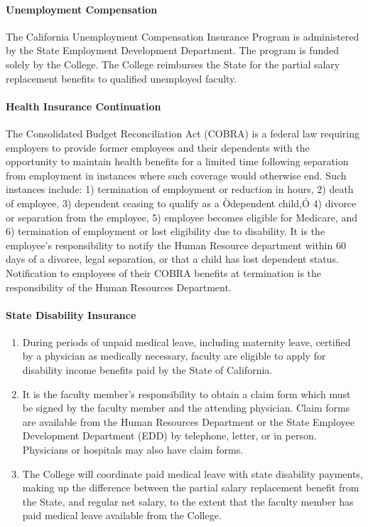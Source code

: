 \documentclass[letterpaper, 11pt]{article}
\begin{document}
			\paragraph{Unemployment Compensation}
				The California Unemployment Compensation Insurance Program is administered by the State Employment Development Department.  The program is funded solely by the College. The College reimburses the State for the partial salary replacement benefits to qualified unemployed faculty.
			\paragraph{Health Insurance Continuation}
				The Consolidated Budget Reconciliation Act (COBRA) is a federal law requiring employers to provide former employees and their dependents with the opportunity to maintain health benefits for a limited time following separation from employment in instances where such coverage would otherwise end.  Such instances include:  1) termination of employment or reduction in hours, 2) death of employee, 3) dependent ceasing to qualify as a Òdependent child,Ó 4) divorce or separation from the employee, 5) employee becomes eligible for Medicare, and 6) termination of employment or lost eligibility due to disability.  It is the employee's responsibility to notify the Human Resource department within 60 days of a divorce, legal separation, or that a child has lost dependent status.  Notification to employees of their COBRA benefits at termination is the responsibility of the Human Resources Department.
			\paragraph{State Disability Insurance}
				\begin{enumerate}[label=\alph*)]
					\item{During periods of unpaid medical leave, including maternity leave, certified by a physician as medically necessary, faculty are eligible to apply for disability income benefits paid by the State of California.}
					\item{It is the faculty member's responsibility to obtain a claim form which must be signed by the faculty member and the attending physician.  Claim forms are available from the Human Resources Department or the State Employee Development Department (EDD) by telephone, letter, or in person.  Physicians or hospitals may also have claim forms.}
					\item{The College will coordinate paid medical leave with state disability payments, making up the difference between the partial salary replacement benefit from the State, and regular net salary, to the extent that the faculty member has paid medical leave available from the College.}
				\end{enumerate}
\end{document}
